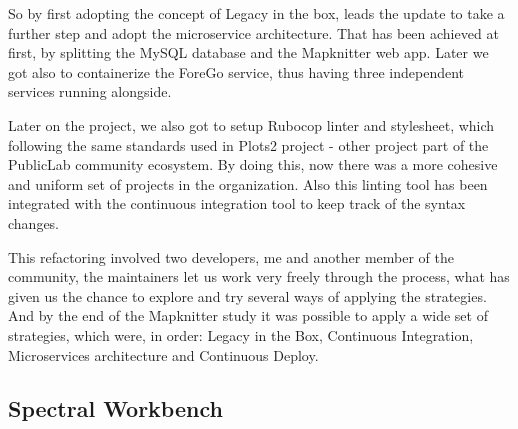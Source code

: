 So by first adopting the concept of Legacy in the box, leads the update to take
a further step and adopt the microservice architecture. That has been achieved
at first, by splitting the MySQL database and the Mapknitter web app. Later we
got also to containerize the ForeGo service, thus having three independent
services running alongside.

Later on the project, we also got to setup Rubocop linter and stylesheet, which
following the same standards used in Plots2 project - other project part of the
PublicLab community ecosystem. By doing this, now there was a more cohesive and
uniform set of projects in the organization. Also this linting tool has been
integrated with the continuous integration tool to keep track of the syntax
changes.

This refactoring involved two developers, me and another member of the
community, the maintainers let us work very freely through the process, what has
given us the chance to explore and try several ways of applying the strategies.
And by the end of the Mapknitter study it was possible to apply a wide set of
strategies, which were, in order: Legacy in the Box, Continuous Integration,
Microservices architecture and Continuous Deploy.

\subsection{Spectral Workbench}

